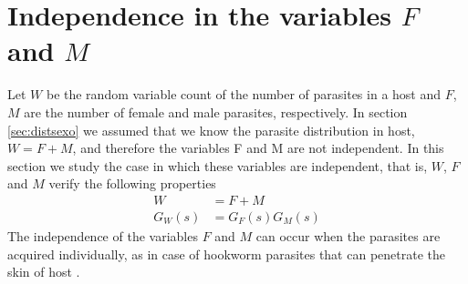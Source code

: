 \documentclass[useAMS,referee,usenatbib]{biom}
\begin{document}

\section{Independence in the variables $F$ and $M$}\label{sec:disindep}
Let $W$ be the random variable count of the number of parasites in a host and $F$, $M$ are the number of female and male parasites, respectively.
In section \ref{sec:distsexo} we assumed that we know the parasite distribution in host, $W=F+M$, and therefore  the variables F and M are not independent.
In this section we study the case in which these variables are independent, that is, $W$, $F$ and $M$ verify the following properties
\begin{equation}\label{independencia}
\begin{split}
W&=F+M\\
G_W(s)&=G_F(s)G_M(s)
\end{split}
\end{equation}
The independence of the variables $F$ and $M$ can occur when the parasites are acquired individually, as in case of hookworm parasites that can penetrate the skin of host \cite{bethony2006soil,hotez2004hookworm}.
\end{document}
